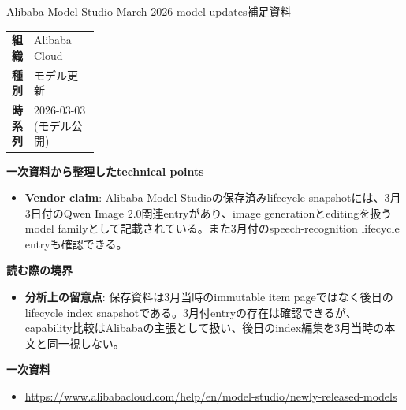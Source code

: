 \begin{technicalnote}{Alibaba Model Studio March 2026 model updates}{補足資料}
\begingroup
\begin{tabularx}{\linewidth}{@{}>{\bfseries}p{0.22\linewidth}X@{}}
組織 & Alibaba Cloud \\
種別 & モデル更新 \\
時系列 & 2026-03-03 (モデル公開) \\
\end{tabularx}
\smallskip
{\bfseries 一次資料から整理したtechnical points}
\begin{itemize}[leftmargin=1.5em,itemsep=0.35em]
\item \textbf{Vendor claim}: Alibaba Model Studioの保存済みlifecycle snapshotには、3月3日付のQwen Image 2.0関連entryがあり、image generationとeditingを扱うmodel familyとして記載されている。また3月付のspeech-recognition lifecycle entryも確認できる。
\end{itemize}
\begin{minipage}{\linewidth}
{\bfseries 読む際の境界}
\begin{itemize}[leftmargin=1.5em,itemsep=0.35em]
\item \textbf{分析上の留意点}: 保存資料は3月当時のimmutable item pageではなく後日のlifecycle index snapshotである。3月付entryの存在は確認できるが、capability比較はAlibabaの主張として扱い、後日のindex編集を3月当時の本文と同一視しない。
\end{itemize}
\begin{samepage}
{\bfseries 一次資料}
\begingroup\sloppy
\begin{itemize}[leftmargin=1.5em,itemsep=0.25em]
\item {\scriptsize\url{https://www.alibabacloud.com/help/en/model-studio/newly-released-models}}
\end{itemize}
\endgroup
\end{samepage}
\end{minipage}
\endgroup
\end{technicalnote}
\medskip
